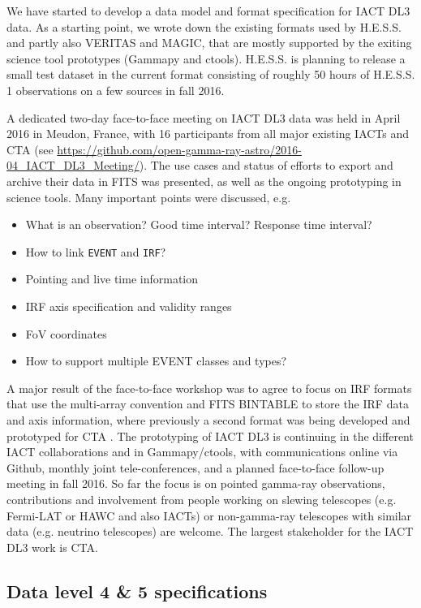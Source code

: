 We have started to develop a data model and format specification for IACT DL3 data. As a starting point, we wrote down the existing formats used by H.E.S.S. and partly also VERITAS and MAGIC, that are mostly supported by the exiting science tool prototypes (Gammapy and ctools). H.E.S.S. is planning to release a small test dataset in the current format consisting of roughly 50 hours of H.E.S.S. 1 observations on a few sources in fall 2016.

A dedicated two-day face-to-face meeting on IACT DL3 data was held in April 2016 in Meudon, France, with 16 participants from all major existing IACTs and CTA (see \url{https://github.com/open-gamma-ray-astro/2016-04_IACT_DL3_Meeting/}). The use cases and status of efforts to export and archive their data in FITS was presented, as well as the ongoing prototyping in science tools. Many important points were discussed, e.g.

\begin{itemize}
\item{}What is an observation? Good time interval? Response time interval?
\item{}How to link \texttt{EVENT} and \texttt{IRF}?
\item{}Pointing and live time information
\item{}IRF axis specification and validity ranges
\item{}FoV coordinates
\item{}How to support multiple EVENT classes and types?
\end{itemize}

A major result of the face-to-face workshop was to agree to focus on IRF formats that use the multi-array convention and FITS BINTABLE to store the IRF data and axis information, where previously a second format was being developed and prototyped for CTA \citep{2015arXiv150807437W}. The prototyping of IACT DL3 is continuing in the different IACT collaborations and in Gammapy/ctools, with communications online via Github, monthly joint tele-conferences, and a planned face-to-face follow-up meeting in fall 2016. So far the focus is on pointed gamma-ray observations, contributions and involvement from people working on slewing telescopes (e.g. Fermi-LAT or HAWC and also IACTs) or non-gamma-ray telescopes with similar data (e.g. neutrino telescopes) are welcome. The largest stakeholder for the IACT DL3 work is CTA.

\subsection{Data level 4 \& 5 specifications}

